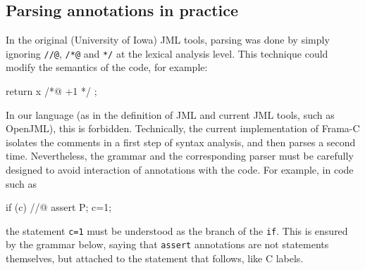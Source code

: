 \subsection{Parsing annotations in practice}

In the original (University of Iowa) JML tools, parsing was done by simply ignoring \verb|//@|, \verb|/*@| and
\verb|*/| at the lexical analysis level. This technique could modify the
semantics of the code, for example:
\begin{listing}{1}
return x /*@ +1 */ ;
\end{listing}
In our language (as in the definition of JML and current JML tools, such as OpenJML), this is forbidden. Technically, the current
implementation of Frama-C isolates the comments in a first step of
syntax analysis, and then parses a second time. Nevertheless, the
grammar and the corresponding parser must be carefully designed to
avoid interaction of annotations with the code. For example, in code such as
\begin{listing}{1}
  if (c) //@ assert P;
     c=1;
\end{listing}
the statement \lstinline|c=1| must be understood as the
branch of the \texttt{if}. This is ensured by the grammar below,
saying that \lstinline|assert| annotations are not statements themselves,
but attached to the statement that follows, like C labels.
